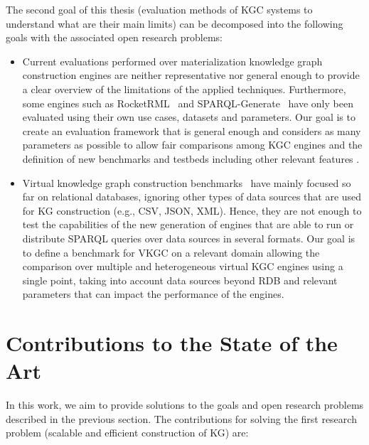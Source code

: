 The second goal of this thesis (evaluation methods of KGC systems to understand what are their main limits) can be decomposed into the following goals with the associated open research problems:
\begin{itemize}
    \item Current evaluations performed over materialization knowledge graph construction engines are neither representative nor general enough to provide a clear overview of the limitations of the applied techniques. Furthermore, some engines such as RocketRML~\citep{csimcsek2019rocketrml} and SPARQL-Generate~\citep{lefranccois2017sparql} have only been evaluated using their own use cases, datasets and parameters. Our goal is to create an evaluation framework that is general enough and considers as many parameters as possible to allow fair comparisons among KGC engines and the definition of new benchmarks and testbeds including other relevant features .
    \item Virtual knowledge graph construction benchmarks~\citep{lanti2015npd,bizer2009berlin} have mainly focused so far on relational databases, ignoring other types of data sources that are used for KG construction (e.g., CSV, JSON, XML). Hence, they are not enough to test the capabilities of the new generation of engines that are able to run or distribute SPARQL queries over data sources in several formats. Our goal is to define a benchmark for VKGC on a relevant domain allowing the comparison over multiple and heterogeneous virtual KGC engines using a single point, taking into account data sources beyond RDB and relevant parameters that can impact the performance of the engines.
\end{itemize}

\section{Contributions to the State of the Art}
In this work, we aim to provide solutions to the goals and open research problems described in the previous section. The contributions for solving the first research problem (scalable and efficient construction of KG) are:


